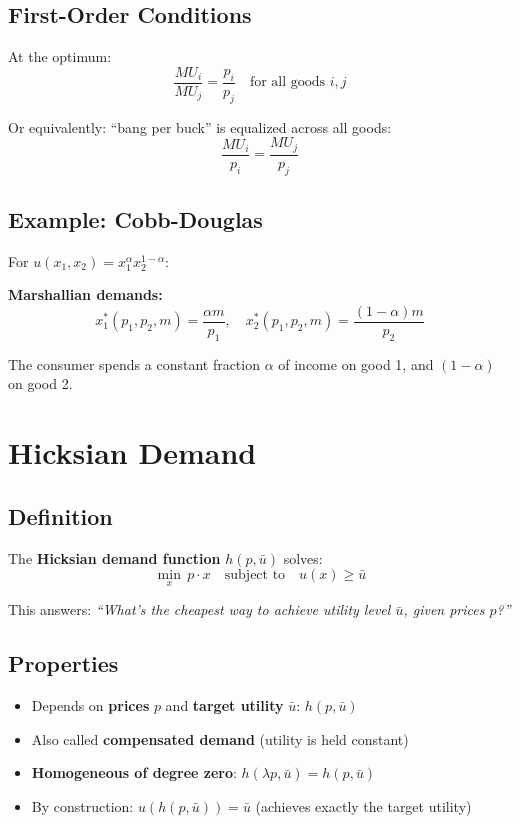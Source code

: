 \documentclass[11pt]{article}
\begin{document}
\subsection{First-Order Conditions}

At the optimum:
\[
\frac{MU_i}{MU_j} = \frac{p_i}{p_j} \quad \text{for all goods } i, j
\]

Or equivalently: ``bang per buck'' is equalized across all goods:
\[
\frac{MU_i}{p_i} = \frac{MU_j}{p_j}
\]

\subsection{Example: Cobb-Douglas}

For $u(x_1, x_2) = x_1^\alpha x_2^{1-\alpha}$:

\textbf{Marshallian demands:}
\[
x_1^*(p_1, p_2, m) = \frac{\alpha m}{p_1}, \quad x_2^*(p_1, p_2, m) = \frac{(1-\alpha) m}{p_2}
\]

The consumer spends a constant fraction $\alpha$ of income on good 1, and $(1-\alpha)$ on good 2.

\section{Hicksian Demand}

\subsection{Definition}

The \textbf{Hicksian demand function} $h(p, \bar{u})$ solves:
\[
\min_{x} \, p \cdot x \quad \text{subject to} \quad u(x) \geq \bar{u}
\]

This answers: \textit{``What's the cheapest way to achieve utility level $\bar{u}$, given prices $p$?''}

\subsection{Properties}

\begin{itemize}
    \item Depends on \textbf{prices} $p$ and \textbf{target utility} $\bar{u}$: $h(p, \bar{u})$
    \item Also called \textbf{compensated demand} (utility is held constant)
    \item \textbf{Homogeneous of degree zero}: $h(\lambda p, \bar{u}) = h(p, \bar{u})$
    \item By construction: $u(h(p, \bar{u})) = \bar{u}$ (achieves exactly the target utility)
\end{itemize}
\end{document}
